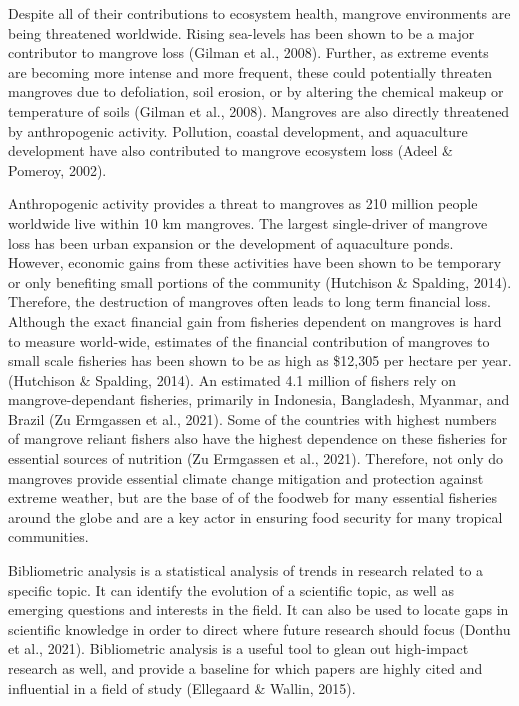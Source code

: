 \documentclass[
  12pt,
]{article}
\begin{document}
Despite all of their contributions to ecosystem health, mangrove environments are being threatened worldwide. Rising sea-levels has been shown to be a major contributor to mangrove loss (Gilman et al., 2008). Further, as extreme events are becoming more intense and more frequent, these could potentially threaten mangroves due to defoliation, soil erosion, or by altering the chemical makeup or temperature of soils (Gilman et al., 2008). Mangroves are also directly threatened by anthropogenic activity. Pollution, coastal development, and aquaculture development have also contributed to mangrove ecosystem loss (Adeel \& Pomeroy, 2002).

Anthropogenic activity provides a threat to mangroves as 210 million people worldwide live within 10 km mangroves. The largest single-driver of mangrove loss has been urban expansion or the development of aquaculture ponds. However, economic gains from these activities have been shown to be temporary or only benefiting small portions of the community (Hutchison \& Spalding, 2014). Therefore, the destruction of mangroves often leads to long term financial loss. Although the exact financial gain from fisheries dependent on mangroves is hard to measure world-wide, estimates of the financial contribution of mangroves to small scale fisheries has been shown to be as high as \$12,305 per hectare per year. (Hutchison \& Spalding, 2014). An estimated 4.1 million of fishers rely on mangrove-dependant fisheries, primarily in Indonesia, Bangladesh, Myanmar, and Brazil (Zu Ermgassen et al., 2021). Some of the countries with highest numbers of mangrove reliant fishers also have the highest dependence on these fisheries for essential sources of nutrition (Zu Ermgassen et al., 2021). Therefore, not only do mangroves provide essential climate change mitigation and protection against extreme weather, but are the base of of the foodweb for many essential fisheries around the globe and are a key actor in ensuring food security for many tropical communities.

Bibliometric analysis is a statistical analysis of trends in research related to a specific topic. It can identify the evolution of a scientific topic, as well as emerging questions and interests in the field. It can also be used to locate gaps in scientific knowledge in order to direct where future research should focus (Donthu et al., 2021). Bibliometric analysis is a useful tool to glean out high-impact research as well, and provide a baseline for which papers are highly cited and influential in a field of study (Ellegaard \& Wallin, 2015).
\end{document}
